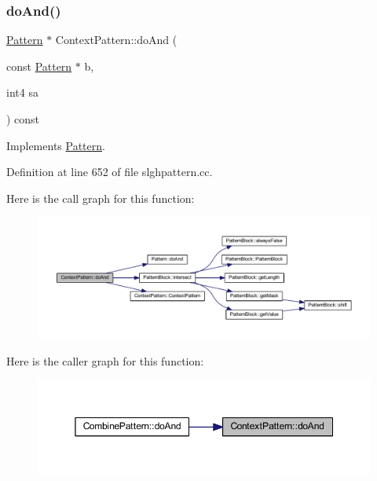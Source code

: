 \subsubsection{\texorpdfstring{doAnd()}{doAnd()}}
{\footnotesize\ttfamily \mbox{\hyperlink{class_pattern}{Pattern}} $\ast$ Context\+Pattern\+::do\+And (\begin{DoxyParamCaption}\item[{const \mbox{\hyperlink{class_pattern}{Pattern}} $\ast$}]{b,  }\item[{int4}]{sa }\end{DoxyParamCaption}) const\hspace{0.3cm}{\ttfamily [virtual]}}



Implements \mbox{\hyperlink{class_pattern_a960f3e000e2642c452fe11f5b55a9589}{Pattern}}.



Definition at line 652 of file slghpattern.\+cc.

Here is the call graph for this function\+:
\nopagebreak
\begin{figure}[H]
\begin{center}
\leavevmode
\includegraphics[width=350pt]{class_context_pattern_acffa2b64552acaf8824b2093119f9eca_cgraph}
\end{center}
\end{figure}
Here is the caller graph for this function\+:
\nopagebreak
\begin{figure}[H]
\begin{center}
\leavevmode
\includegraphics[width=350pt]{class_context_pattern_acffa2b64552acaf8824b2093119f9eca_icgraph}
\end{center}
\end{figure}
\mbox{\label{class_context_pattern_aa80ff4baf1fae14a7e5cd744d1409620}} 
